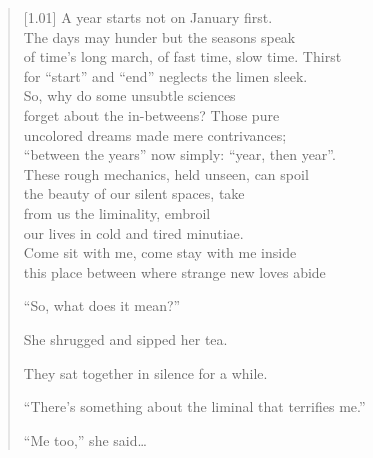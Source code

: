\begin{verse}[1.01\textwidth]
A year starts not on January first.\\
\vin The days may hunder but the seasons speak\\
of time's long march, of fast time, slow time. Thirst\\
\vin for ``start'' and ``end'' neglects the limen sleek.\\
So, why do some unsubtle sciences\\
\vin forget about the in-betweens? Those pure\\
uncolored dreams made mere contrivances;\\
\vin ``between the years'' now simply: ``year, then year''.\\
These rough mechanics, held unseen, can spoil\\
\vin the beauty of our silent spaces, take\\
from us the liminality, embroil\\
\vin our lives in cold and tired minutiae.\\
\vin \vin Come sit with me, come stay with me inside\\
\vin \vin this place between where strange new loves abide

\secdiv

``So, what does it mean?''

She shrugged and sipped her tea.

They sat together in silence for a while.

``There's something about the liminal that terrifies me.''

\hfill ``Me too,'' she said\ldots{}
\end{verse}
